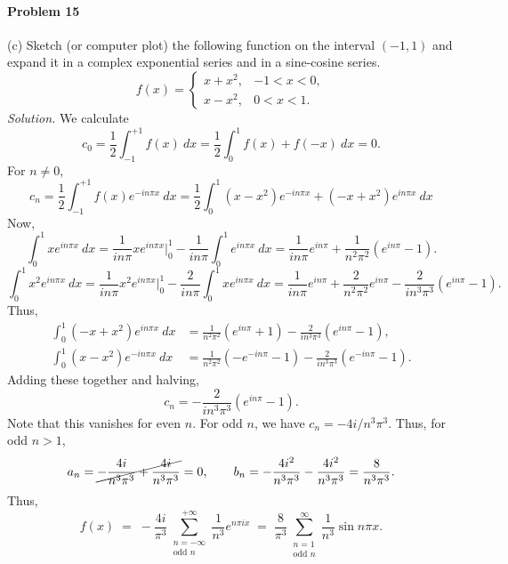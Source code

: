 \documentclass[10pt]{article}
\begin{document}
        \paragraph{Problem 15} (c) Sketch (or computer plot) the following function on the interval $(−1, 1)$ and expand it in a 
        complex exponential series and in a sine-cosine series.
        \[
                f(x) = \begin{cases}
                        x + x^2, & -1 < x < 0, \\
                        x - x^2, & 0 < x < 1.
                \end{cases}
        \]
        \textit{Solution.} We calculate
        \[
                c_0 = \frac{1}{2}\int_{-1}^{+1} f(x)\:dx = \frac{1}{2}\int_0^1 f(x) + f(-x)\:dx = 0.
        \]
        For $n \neq 0$,
        \[
                c_n = \frac{1}{2}\int_{-1}^{+1} f(x)e^{-in\pi x}\:dx = \frac{1}{2}\int_0^1 (x - x^2)e^{-in\pi x} + (-x + x^2)e^{in\pi x}\:dx
        \]
        Now,
        \[
                \int_0^1 xe^{in\pi x}\:dx = \frac{1}{in\pi}xe^{in\pi x}\Big|_0^1 - \frac{1}{in\pi}\int_0^1 e^{in\pi x}\:dx
                        = \frac{1}{in\pi}e^{in\pi} + \frac{1}{n^2\pi^2}(e^{in\pi} - 1).
        \]
        \[
                \int_0^1 x^2e^{in\pi x}\:dx = \frac{1}{in\pi}x^2e^{in\pi x}\Big|_0^1 - \frac{2}{in\pi}\int_0^1 xe^{in\pi x}\:dx
                        = \frac{1}{in\pi}e^{in\pi} + \frac{2}{n^2\pi^2}e^{in\pi} - \frac{2}{in^3\pi^3}(e^{in\pi} - 1).
        \]
        Thus,
        \begin{align*}
                \int_0^1(-x + x^2)e^{in\pi x}\:dx &= \frac{1}{n^2\pi^2}( e^{in\pi}  + 1) - \frac{2}{in^3\pi^3}(e^{in\pi} - 1),\\
                \int_0^1(x - x^2)e^{-in\pi x}\:dx &= \frac{1}{n^2\pi^2}(-e^{-in\pi} - 1) - \frac{2}{in^3\pi^3}(e^{-in\pi} - 1).
        \end{align*}    
        Adding these together and halving,
        \[
                c_n = - \frac{2}{in^3\pi^3}(e^{in\pi} - 1).
        \]
        Note that this vanishes for even $n$. For odd $n$, we have $c_n = -4i /n^3\pi^3$. Thus, for odd $n > 1$,
        \[
                a_n = \cancel{-\frac{4i}{n^3\pi^3} + \frac{4i}{n^3\pi^3}} = 0, \qquad 
                b_n = -\frac{4i^2}{n^3\pi^3} - \frac{4i^2}{n^3\pi^3} = \frac{8}{n^3\pi^3}.
        \]
        Thus,
        \[
                f(x) \;=\; -\frac{4i}{\pi^3}\sum_{\substack{n = -\infty \\ \text{odd }n}}^{+\infty} \frac{1}{n^3} e^{n\pi ix} \;=\;
                        \frac{8}{\pi^3}\sum_{\substack{n = 1\\\text{odd }n}}^\infty \frac{1}{n^3} \sin{n\pi x}. \tag{$\star$}
        \]
\end{document}
